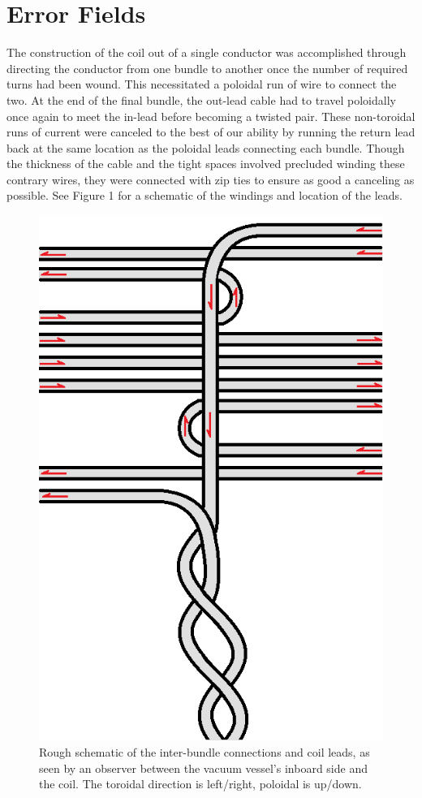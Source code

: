 \section{Error Fields} 
The construction of the coil out of a single conductor was accomplished through directing the conductor from one bundle to another once the number of required turns had been wound.  This necessitated a poloidal run of wire to connect the two.  At the end of the final bundle, the out-lead cable had to travel poloidally once again to meet the in-lead before becoming a twisted pair.  These non-toroidal runs of current were canceled to the best of our ability by running the return lead back at the same location as the poloidal leads connecting each bundle.  Though the thickness of the cable and the tight spaces involved precluded winding these contrary wires, they were connected with zip ties to ensure as good a canceling as possible.  See Figure 1 for a schematic of the windings and location of the leads.\\
\begin{figure}
\includegraphics[width = \textwidth]{./figures/Coil_winding_schematic.png}\begin{flushleft}
\caption{Rough schematic of the inter-bundle connections and coil leads, as seen by an observer between the vacuum vessel's inboard side and the coil.  The toroidal direction is left/right, poloidal is up/down.}
\end{flushleft}
\label{raw_sig}
\end{figure}
